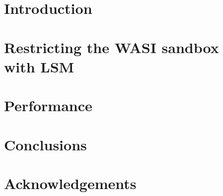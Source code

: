 \documentclass[a4paper,12pt,twoside,openright]{report}
\begin{document}
  
  \emptypage
  
  \emptypage
  \toc
  \emptypage

  \clearpage
  
  \chapter{Introduction}
  

  \chapter{Restricting the WASI sandbox with LSM}
  \label{chap:restricting-wasi}
  

  \chapter{Performance}
  \label{chap:performance}
  

  \chapter{Conclusions}
  

  \nocite{*}
  \printbibliography[heading=bibintoc]

  \chapter*{Acknowledgements}
  
\end{document}
